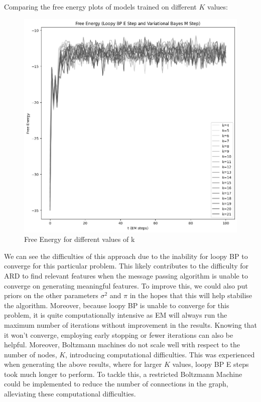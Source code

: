\documentclass[12pt]{article}
\begin{document}
\newpage
Comparing the free energy plots of models trained on different $K$ values:

\begin{figure}[h]
\centering
\includegraphics[scale=0.4]{outputs/q5/d-free-energy}
\caption{Free Energy for different values of k}
\label{fig:}
\end{figure}

We can see the difficulties of this approach due to the inability for loopy BP to converge for this particular problem.
This likely contributes to the difficulty for ARD to find relevant features when the message passing algorithm is unable to converge on generating meaningful features.
To improve this, we could also put priors on the other parameters $\sigma^2$ and $\pi$ in the hopes that this will help stabilise the algorithm.
Moreover, because loopy BP is unable to converge for this problem, it is quite computationally intensive as EM will always run the maximum number of iterations without improvement in the results.
Knowing that it won't converge, employing early stopping or fewer iterations can also be helpful.
Moreover, Boltzmann machines do not scale well with respect to the number of nodes, $K$, introducing computational difficulties.
This was experienced when generating the above results, where for larger $K$ values, loopy BP E steps took much longer to perform. To tackle this, a restricted Boltzmann Machine could be implemented to reduce the number of connections in the graph, alleviating these computational difficulties.
\end{document}
